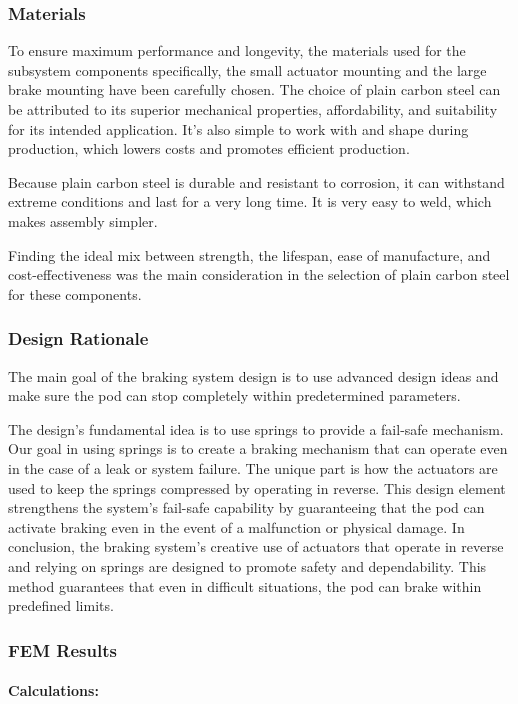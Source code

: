 \newpage
\subsubsection{Materials}
To ensure maximum performance and longevity, the materials used for the subsystem components specifically, the small actuator mounting and the large brake mounting have been carefully chosen.  The choice of plain carbon steel can be attributed to its superior mechanical properties, affordability, and suitability for its intended application. It's also simple to work with and shape during production, which lowers costs and promotes efficient production.


Because plain carbon steel is durable and resistant to corrosion, it can withstand extreme conditions and last for a very long time. It is very easy to weld, which makes assembly simpler.

Finding the ideal mix between strength, the lifespan, ease of manufacture, and cost-effectiveness was the main consideration in the selection of plain carbon steel for these components.

\subsubsection{Design Rationale}
The main goal of the braking system design is to use advanced design ideas and make sure the pod can stop completely within predetermined parameters.

The design's fundamental idea is to use springs to provide a fail-safe mechanism. Our goal in using springs is to create a braking mechanism that can operate even in the case of a leak or system failure. The unique part is how the actuators are used to keep the springs compressed by operating in reverse. This design element strengthens the system's fail-safe capability by guaranteeing that the pod can activate braking even in the event of a malfunction or physical damage.
In conclusion, the braking system's creative use of actuators that operate in reverse and relying on springs are designed to promote safety and dependability. This method guarantees that even in difficult situations, the pod can brake within predefined limits. 
\subsubsection{FEM Results}
\paragraph{\Large{Calculations:}}






